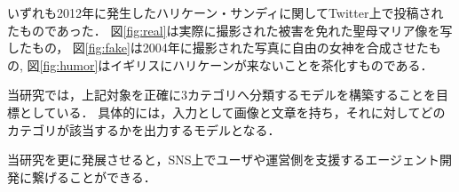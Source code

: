 いずれも2012年に発生したハリケーン・サンディに関してTwitter上で投稿されたものであった．
図\ref{fig:real}は実際に撮影された被害を免れた聖母マリア像を写したもの，
図\ref{fig:fake}は2004年に撮影された写真に自由の女神を合成させたもの\cite{harmanci_2012},
図\ref{fig:humor}はイギリスにハリケーンが来ないことを茶化すものである．

%
当研究では，上記対象を正確に3カテゴリへ分類するモデルを構築することを目標としている．
具体的には，入力として画像と文章を持ち，それに対してどのカテゴリが該当するかを出力するモデルとなる．

当研究を更に発展させると，SNS上でユーザや運営側を支援するエージェント開発に繋げることができる．
%